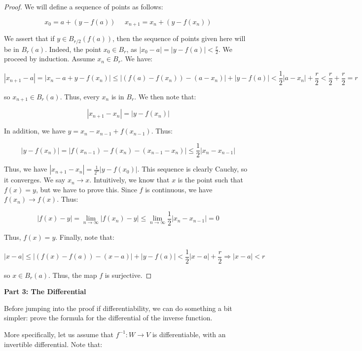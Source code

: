 \documentclass[10pt, oneside]{amsart}
\begin{document}
    \begin{proof}
      We will define a sequence of points as follows:

      $$x_0 = a + (y - f(a)) \ \ \ \ \ \ x_{n + 1} = x_n + (y - f(x_n))$$

      We assert that if $y \in B_{r/2}(f(a))$, then the sequence of points given here will be in $B_{r}(a)$. Indeed, the point $x_0 \in B_r$, as $|x_0 - a| = |y - f(a)| < \frac{r}{2}$. We proceed by induction. Assume $x_n \in B_r$. We have:

      $$|x_{n + 1} - a| = |x_n - a + y - f(x_n)| \leq |(f(a) - f(x_n)) - (a - x_n)| + |y - f(a)| < \frac{1}{2} |a - x_n| + \frac{r}{2} < \frac{r}{2} + \frac{r}{2} = r$$

      so $x_{n + 1} \in B_r(a)$. Thus, every $x_n$ is in $B_r$. We then note that:

      $$|x_{n + 1} - x_n| = |y - f(x_n)|$$

      In addition, we have $y = x_{n} - x_{n - 1} + f(x_{n - 1})$. Thus:

      $$|y - f(x_n)| = | f(x_{n - 1}) - f(x_n) - (x_{n - 1} - x_{n}) | \leq \frac{1}{2} |x_{n} - x_{n - 1}|$$

      Thus, we have $|x_{n + 1} - x_n| = \frac{1}{2^n} | y - f(x_0) |$. This sequence is clearly Cauchy, so it converges. We say $x_n \rightarrow x$. Intuitively, we know that $x$ is the point such that $f(x) = y$, but we have to prove
      this. Since $f$ is continuous, we have $f(x_n) \rightarrow f(x)$. Thus:

      $$|f(x) - y| = \lim_{n \to \infty} |f(x_n) - y| \leq \lim_{n \to \infty}  \frac{1}{2} |x_{n} - x_{n - 1}| = 0$$

      Thus, $f(x) = y$. Finally, note that:

      $$|x - a| \leq |(f(x) - f(a)) - (x - a)| + |y - f(a)| < \frac{1}{2} |x - a| + \frac{r}{2} \Rightarrow |x - a| < r$$

      so $x \in B_r(a)$. Thus, the map $f$ is surjective.
    \end{proof}

    \textbf{Part 3: The Differential}
    \newline

    Before jumping into the proof if differentiability, we can do something a bit simpler: prove the formula for the differential of the inverse function.
    \newline

    More specifically, let us assume that
    $f^{-1} : W \rightarrow V$ is differentiable, with an invertible differential. Note that:
\end{document}

